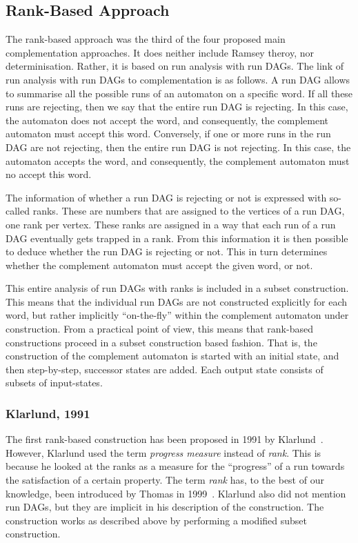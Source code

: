 \subsection{Rank-Based Approach}
The rank-based approach was the third of the four proposed main complementation approaches. It does neither include Ramsey theroy, nor determinisation. Rather, it is based on run analysis with run DAGs. The link of run analysis with run DAGs to complementation is as follows. A run DAG allows to summarise all the possible runs of an automaton on a specific word. If all these runs are rejecting, then we say that the entire run DAG is rejecting. In this case, the automaton does not accept the word, and consequently, the complement automaton must accept this word. Conversely, if one or more runs in the run DAG are not rejecting, then the entire run DAG is not rejecting. In this case, the automaton accepts the word, and consequently, the complement automaton must no accept this word.

The information of whether a run DAG is rejecting or not is expressed with so-called ranks. These are numbers that are assigned to the vertices of a run DAG, one rank per vertex. These ranks are assigned in a way that each run of a run DAG eventually gets trapped in a rank. From this information it is then possible to deduce whether the run DAG is rejecting or not. This in turn determines whether the complement automaton must accept the given word, or not.

This entire analysis of run DAGs with ranks is included in a subset construction. This means that the individual run DAGs are not constructed explicitly for each word, but rather implicitly ``on-the-fly'' within the complement automaton under construction. From a practical point of view, this means that rank-based constructions proceed in a subset construction based fashion. That is, the construction of the complement automaton is started with an initial state, and then step-by-step, successor states are added. Each output state consists of subsets of input-states.

\subsubsection{Klarlund, 1991}
The first rank-based construction has been proposed in 1991 by Klarlund~\cite{1991_klarlund}. However, Klarlund used the term \textit{progress measure} instead of \textit{rank}. This is because he looked at the ranks as a measure for the ``progress'' of a run towards the satisfaction of a certain property. The term \textit{rank} has, to the best of our knowledge, been introduced by Thomas in 1999~\cite{1999_thomas}. Klarlund also did not mention run DAGs, but they are implicit in his description of the construction. The construction works as described above by performing a modified subset construction. 

